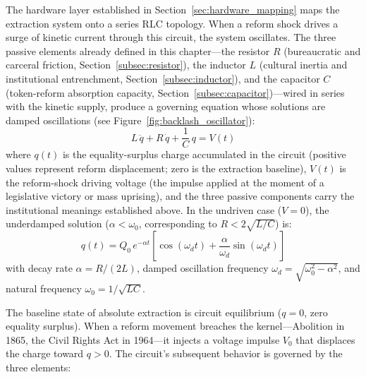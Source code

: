The hardware layer established in Section~\ref{sec:hardware_mapping} maps the extraction system onto a series RLC topology. When a reform shock drives a surge of kinetic current through this circuit, the system oscillates. The three passive elements already defined in this chapter---the resistor $R$ (bureaucratic and carceral friction, Section~\ref{subsec:resistor}), the inductor $L$ (cultural inertia and institutional entrenchment, Section~\ref{subsec:inductor}), and the capacitor $C$ (token-reform absorption capacity, Section~\ref{subsec:capacitor})---wired in series with the kinetic supply, produce a governing equation whose solutions are damped oscillations (see Figure~\ref{fig:backlash_oscillator}):
\begin{equation}\label{eq:1.7a-rlc-governing}
L\,\ddot{q} + R\,\dot{q} + \frac{1}{C}\,q = V(t)
\end{equation}
where $q(t)$ is the equality-surplus charge accumulated in the circuit (positive values represent reform displacement; zero is the extraction baseline), $V(t)$ is the reform-shock driving voltage (the impulse applied at the moment of a legislative victory or mass uprising), and the three passive components carry the institutional meanings established above. In the undriven case ($V = 0$), the underdamped solution ($\alpha < \omega_0$, corresponding to $R < 2\sqrt{L/C}$) is:
\begin{equation}\label{eq:1.7b-rlc-solution}
q(t) = Q_0\,e^{-\alpha t}\!\left[\cos(\omega_d t) + \frac{\alpha}{\omega_d}\sin(\omega_d t)\right]
\end{equation}
with decay rate $\alpha = R/(2L)$, damped oscillation frequency $\omega_d = \sqrt{\omega_0^2 - \alpha^2}$, and natural frequency $\omega_0 = 1/\sqrt{LC}$.

The baseline state of absolute extraction is circuit equilibrium ($q = 0$, zero equality surplus). When a reform movement breaches the kernel---Abolition in 1865, the Civil Rights Act in 1964---it injects a voltage impulse $V_0$ that displaces the charge toward $q > 0$. The circuit's subsequent behavior is governed by the three elements:

